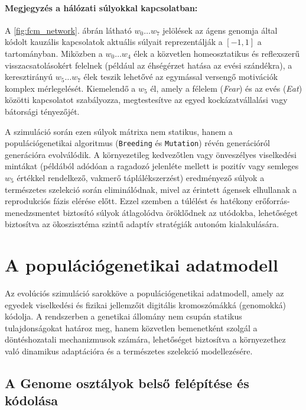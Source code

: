 \paragraph{Megjegyzés a hálózati súlyokkal kapcsolatban:}
A \ref{fig:fcm_network}. ábrán látható $\mathit{w}_{0}\dots\mathit{w}_{7}$ jelölések az ágens genomja által kódolt kauzális kapcsolatok aktuális súlyait reprezentálják a $[-1, 1]$ a tartományban. Miközben a $\mathit{w}_{0}\dots\mathit{w}_{4}$ élek a közvetlen homeosztatikus és reflexszerű visszacsatolásokért felelnek (például az éhségérzet hatása az evési szándékra), a keresztirányú $\mathit{w}_{5}\dots\mathit{w}_{7}$ élek teszik lehetővé az egymással versengő motivációk komplex mérlegelését. Kiemelendő a $\mathit{w}_{5}$ él, amely a félelem (\textit{Fear}) és az evés (\textit{Eat}) közötti kapcsolatot szabályozza, megtestesítve az egyed kockázatvállalási vagy bátorsági tényezőjét.

A szimuláció során ezen súlyok mátrixa nem statikus, hanem a populációgenetikai algoritmus (\texttt{Breeding} és \texttt{Mutation}) révén generációról generációra evolválódik. A környezetileg kedvezőtlen vagy önveszélyes viselkedési mintákat (példából adódóan a ragadozó jelenléte mellett is pozitív vagy semleges $\mathit{w}_{5}$ értékkel rendelkező, vakmerő táplálékszerzést) eredményező súlyok a természetes szelekció során eliminálódnak, mivel az érintett ágensek elhullanak a reprodukciós fázis elérése előtt. Ezzel szemben a túlélést és hatékony erőforrás-menedzsmentet biztosító súlyok átlagolódva öröklődnek az utódokba, lehetőséget biztosítva az ökoszisztéma szintű adaptív stratégiák autonóm kialakulására.

\section{A populációgenetikai adatmodell}

Az evolúciós szimuláció sarokköve a populációgenetikai adatmodell, amely az egyedek viselkedési és fizikai jellemzőit digitális kromoszómákká (genomokká) kódolja. A rendszerben a genetikai állomány nem csupán statikus tulajdonságokat határoz meg, hanem közvetlen bemenetként szolgál a döntéshozatali mechanizmusok számára, lehetőséget biztosítva a környezethez való dinamikus adaptációra és a természetes szelekció modellezésére.

\subsection{A Genome osztályok belső felépítése és kódolása}

